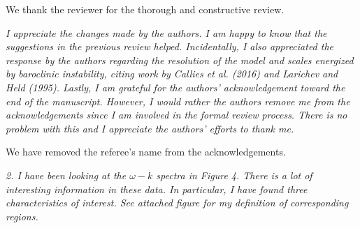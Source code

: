 \documentclass[11pt]{article}
\newcommand{\bdp}{\begin{description}}
\newcommand{\edp}{\end{description}}
\begin{document}
\bdp
   \item We thank the reviewer for the thorough and constructive review.
\edp

\begin{enumerate}
 \item {\it I appreciate the changes made by the authors. I am happy to know that the suggestions in
the previous review helped. Incidentally, I also appreciated the response by the authors
regarding the resolution of the model and scales energized by baroclinic instability, citing
work by Callies et al. (2016) and Larichev and Held (1995). Lastly, I am grateful for the
authors’ acknowledgement toward the end of the manuscript. However, I would rather the
authors remove me from the acknowledgements since I am involved in the formal review
process. There is no problem with this and I appreciate the authors’ efforts to thank me.}

\bdp
   \item We have removed the referee's name from the acknowledgements.
\edp

\item {\it 2. I have been looking at the $\omega-k$ spectra in Figure 4. There is a lot of interesting
information in these data. In particular, I have found three characteristics of interest. See
attached figure for my definition of corresponding regions.}




\end{enumerate}
\end{document}

